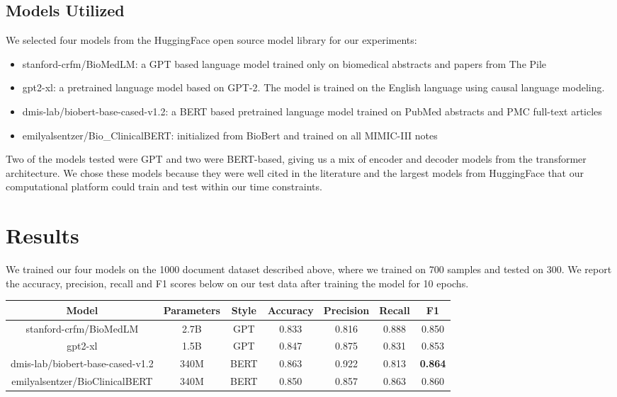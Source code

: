 \documentclass[manuscript,screen,review,nonacm]{acmart}
\begin{document}
\subsection{Models Utilized}
We selected four models from the HuggingFace open source model library for our experiments:
\begin{itemize}
  \item stanford-crfm/BioMedLM: a GPT based language model trained only on biomedical abstracts and papers from The Pile
  \item gpt2-xl: a pretrained language model based on GPT-2. The model is trained on the English language using causal language modeling.
  \item dmis-lab/biobert-base-cased-v1.2: a BERT based pretrained language model trained on PubMed abstracts and PMC full-text articles
  \item emilyalsentzer/Bio\_ClinicalBERT: initialized from BioBert and trained on all MIMIC-III notes
\end{itemize}
Two of the models tested were GPT and two were BERT-based, giving us a mix of encoder and decoder models from the transformer architecture. We chose these models because they were well cited in the literature and the largest models from HuggingFace that our computational platform could train and test within our time constraints. 


\section{Results}

We trained our four models on the 1000 document dataset described above, where we trained on 700 samples and tested on 300. We report the accuracy, precision, recall and F1 scores below on our test data after training the model for 10 epochs. 

\begin{center}
\begin{tabular}{||c c c c c c c ||} 
 \hline
 Model & Parameters & Style & Accuracy & Precision & Recall & F1 \\ [0.5ex] 
 \hline\hline
 stanford-crfm/BioMedLM & 2.7B & GPT & 0.833 & 0.816 & 0.888 & 0.850
 \\ 
 \hline
 gpt2-xl & 1.5B & GPT & 0.847 & 0.875 & 0.831 & 0.853 \\
 \hline
 dmis-lab/biobert-base-cased-v1.2 & 340M & BERT & 0.863 & 0.922 & 0.813 & \textbf{0.864} \\
 \hline
 emilyalsentzer/BioClinicalBERT & 340M & BERT & 0.850 & 0.857 & 0.863 & 0.860 \\ [1ex] 
 \hline
\end{tabular}
\end{center}
\end{document}
